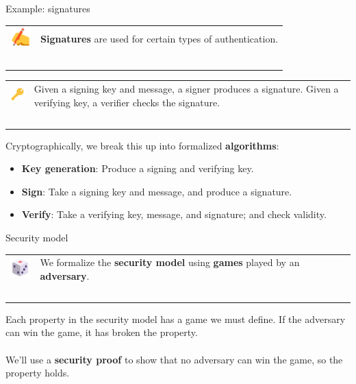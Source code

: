 \documentclass[aspectratio=169]{beamer}
\begin{document}
\begin{frame}{Example: signatures}
    \begin{tabular}{>{\arraybackslash}m{40px} >{\arraybackslash}m{320px}}
        \includegraphics[width=30px]{images/pen.png} & \textbf{Signatures} are used for certain types of authentication. \\~\\
    \end{tabular}

    \begin{tabular}{>{\arraybackslash}m{40px} >{\arraybackslash}m{320px}}
        \includegraphics[width=30px]{images/key.png} & Given a signing key and message, a signer produces a signature. Given a verifying key, a verifier checks the signature. \\~\\
    \end{tabular}

    Cryptographically, we break this up into formalized \textbf{algorithms}:
    \begin{itemize}
        \item \textbf{Key generation}: Produce a signing and verifying key.
        \item \textbf{Sign}: Take a signing key and message, and produce a signature.
        \item \textbf{Verify}: Take a verifying key, message, and signature; and check validity.
    \end{itemize}
\end{frame}

\begin{frame}{Security model}
    \begin{tabular}{>{\arraybackslash}m{40px} >{\arraybackslash}m{320px}}
        \includegraphics[width=30px]{images/die.png} & We formalize the \textbf{security model} using \textbf{games} played by an \textbf{adversary}. \\~\\
    \end{tabular}

    Each property in the security model has a game we must define.
    If the adversary can win the game, it has broken the property. \\~\\

    We'll use a \textbf{security proof} to show that no adversary can win the game, so the property holds.
\end{frame}
\end{document}

